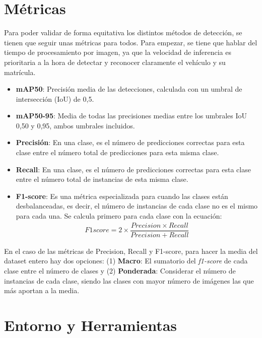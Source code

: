 \documentclass[12pt,a4paper,onecolumn,oneside]{report}
\begin{document}
\section{Métricas}

Para poder validar de forma equitativa los distintos métodos de detección, se tienen que seguir unas métricas para todos. Para empezar, se tiene que hablar del tiempo de procesamiento por imagen, ya que la velocidad de inferencia es prioritaria a la hora de detectar y reconocer claramente el vehículo y su matrícula.

\begin{itemize}
    \item \textbf{mAP50}: Precisión media de las detecciones, calculada con un umbral de intersección (IoU) de 0,5.

    \item \textbf{mAP50-95}: Media de todas las precisiones medias entre los umbrales IoU 0,50 y 0,95, ambos umbrales incluidos.

    \item \textbf{Precisión}: En una clase, es el número de predicciones correctas para esta clase entre el número total de predicciones para esta misma clase.

    \item \textbf{Recall}: En una clase, es el número de predicciones correctas para esta clase entre el número total de instancias de esta misma clase.

    \item \textbf{F1-score}: Es una métrica especializada para cuando las clases están desbalanceadas, es decir, el número de instancias de cada clase no es el mismo para cada una. Se calcula primero para cada clase con la ecuación:
    \begin{gather*}
        F1score = 2 \times \dfrac{Precision \times Recall}{Precision + Recall}
    \end{gather*}
\end{itemize}

En el caso de las métricas de Precision, Recall y F1-score, para hacer la media del dataset entero hay dos opciones: (1) \textbf{Macro}: El sumatorio del \textit{f1-score} de cada clase entre el número de clases y (2) \textbf{Ponderada}: Considerar el número de instancias de cada clase, siendo las clases con mayor número de imágenes las que más aportan a la media.

\section{Entorno y Herramientas}
\label{Entorno y herramientas}
\end{document}
